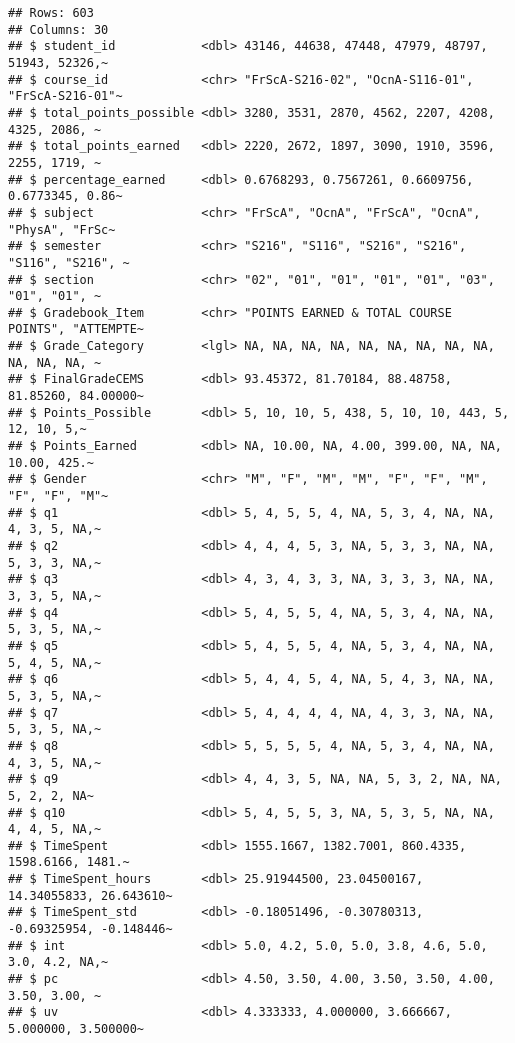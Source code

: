 \documentclass[
]{article}
\begin{document}
\begin{verbatim}
## Rows: 603
## Columns: 30
## $ student_id            <dbl> 43146, 44638, 47448, 47979, 48797, 51943, 52326,~
## $ course_id             <chr> "FrScA-S216-02", "OcnA-S116-01", "FrScA-S216-01"~
## $ total_points_possible <dbl> 3280, 3531, 2870, 4562, 2207, 4208, 4325, 2086, ~
## $ total_points_earned   <dbl> 2220, 2672, 1897, 3090, 1910, 3596, 2255, 1719, ~
## $ percentage_earned     <dbl> 0.6768293, 0.7567261, 0.6609756, 0.6773345, 0.86~
## $ subject               <chr> "FrScA", "OcnA", "FrScA", "OcnA", "PhysA", "FrSc~
## $ semester              <chr> "S216", "S116", "S216", "S216", "S116", "S216", ~
## $ section               <chr> "02", "01", "01", "01", "01", "03", "01", "01", ~
## $ Gradebook_Item        <chr> "POINTS EARNED & TOTAL COURSE POINTS", "ATTEMPTE~
## $ Grade_Category        <lgl> NA, NA, NA, NA, NA, NA, NA, NA, NA, NA, NA, NA, ~
## $ FinalGradeCEMS        <dbl> 93.45372, 81.70184, 88.48758, 81.85260, 84.00000~
## $ Points_Possible       <dbl> 5, 10, 10, 5, 438, 5, 10, 10, 443, 5, 12, 10, 5,~
## $ Points_Earned         <dbl> NA, 10.00, NA, 4.00, 399.00, NA, NA, 10.00, 425.~
## $ Gender                <chr> "M", "F", "M", "M", "F", "F", "M", "F", "F", "M"~
## $ q1                    <dbl> 5, 4, 5, 5, 4, NA, 5, 3, 4, NA, NA, 4, 3, 5, NA,~
## $ q2                    <dbl> 4, 4, 4, 5, 3, NA, 5, 3, 3, NA, NA, 5, 3, 3, NA,~
## $ q3                    <dbl> 4, 3, 4, 3, 3, NA, 3, 3, 3, NA, NA, 3, 3, 5, NA,~
## $ q4                    <dbl> 5, 4, 5, 5, 4, NA, 5, 3, 4, NA, NA, 5, 3, 5, NA,~
## $ q5                    <dbl> 5, 4, 5, 5, 4, NA, 5, 3, 4, NA, NA, 5, 4, 5, NA,~
## $ q6                    <dbl> 5, 4, 4, 5, 4, NA, 5, 4, 3, NA, NA, 5, 3, 5, NA,~
## $ q7                    <dbl> 5, 4, 4, 4, 4, NA, 4, 3, 3, NA, NA, 5, 3, 5, NA,~
## $ q8                    <dbl> 5, 5, 5, 5, 4, NA, 5, 3, 4, NA, NA, 4, 3, 5, NA,~
## $ q9                    <dbl> 4, 4, 3, 5, NA, NA, 5, 3, 2, NA, NA, 5, 2, 2, NA~
## $ q10                   <dbl> 5, 4, 5, 5, 3, NA, 5, 3, 5, NA, NA, 4, 4, 5, NA,~
## $ TimeSpent             <dbl> 1555.1667, 1382.7001, 860.4335, 1598.6166, 1481.~
## $ TimeSpent_hours       <dbl> 25.91944500, 23.04500167, 14.34055833, 26.643610~
## $ TimeSpent_std         <dbl> -0.18051496, -0.30780313, -0.69325954, -0.148446~
## $ int                   <dbl> 5.0, 4.2, 5.0, 5.0, 3.8, 4.6, 5.0, 3.0, 4.2, NA,~
## $ pc                    <dbl> 4.50, 3.50, 4.00, 3.50, 3.50, 4.00, 3.50, 3.00, ~
## $ uv                    <dbl> 4.333333, 4.000000, 3.666667, 5.000000, 3.500000~
\end{verbatim}
\end{document}
